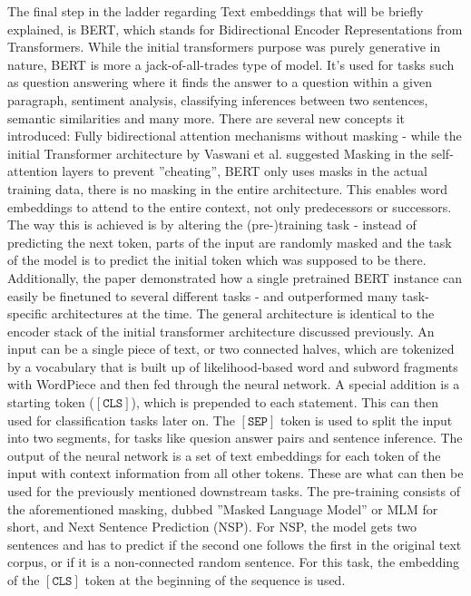 \documentclass[draft,final]{vutinfth} %
\begin{document}
The final step in the ladder regarding Text embeddings that will be briefly explained, is BERT, which stands for Bidirectional Encoder Representations from Transformers. While the initial transformers purpose was purely generative in nature, BERT is more a jack-of-all-trades type of model. It's used for tasks such as question answering where it finds the answer to a question within a given paragraph, sentiment analysis, classifying inferences between two sentences, semantic similarities and many more. There are several new concepts it introduced: Fully bidirectional attention mechanisms without masking - while the initial Transformer architecture by Vaswani et al. suggested Masking in the self-attention layers to prevent ''cheating'', BERT only uses masks in the actual training data, there is no masking in the entire architecture. This enables word embeddings to attend to the entire context, not only predecessors or successors. The way this is achieved is by altering the (pre-)training task - instead of predicting the next token, parts of the input are randomly masked and the task of the model is to predict the initial token which was supposed to be there. Additionally, the paper demonstrated how a single pretrained BERT instance can easily be finetuned to several different tasks - and outperformed many task-specific architectures at the time. The general architecture is identical to the encoder stack of the initial transformer architecture discussed previously. An input can be a single piece of text, or two connected halves, which are tokenized by a vocabulary that is built up of likelihood-based word and subword fragments with WordPiece \cite{wu_googles_2016} and then fed through the neural network. A special addition is a starting token ($\mathtt{[CLS]}$), which is prepended to each statement. This can then used for classification tasks later on. The $\mathtt{[SEP]}$ token is used to split the input into two segments, for tasks like quesion answer pairs and sentence inference. The output of the neural network is a set of text embeddings for each token of the input with context information from all other tokens. These are what can then be used for the previously mentioned downstream tasks. The pre-training consists of the aforementioned masking, dubbed ''Masked Language Model'' or MLM for short, and Next Sentence Prediction (NSP). For NSP, the model gets two sentences and has to predict if the second one follows the first in the original text corpus, or if it is a non-connected random sentence. For this task, the embedding of the $\mathtt{[CLS]}$ token at the beginning of the sequence is used. \cite{BERT}
\end{document}
